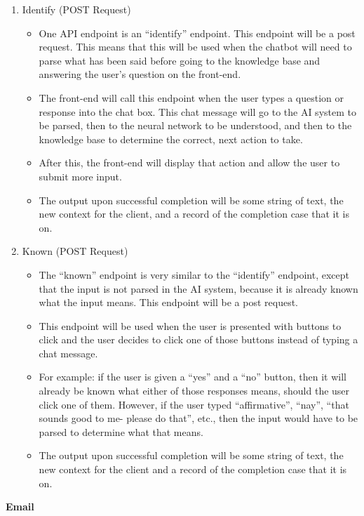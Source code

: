 \documentclass[titlepage, 12pt]{article}
\begin{document}
\begin{enumerate}
    \item Identify (POST Request)
    \begin{itemize}
        \item One API endpoint is an “identify” endpoint. This endpoint will be a post request. This means that this will be used when the chatbot will need to parse what has been said before going to the knowledge base and answering the user’s question on the front-end.
        \item The front-end will call this endpoint when the user types a question or response into the chat box. This chat message will go to the AI system to be parsed, then to the neural network to be understood, and then to the knowledge base to determine the correct, next action to take.
        \item After this, the front-end will display that action and allow the user to submit more input.
        \item The output upon successful completion will be some string of text, the new context for the client, and a record of the completion case that it is on.
    \end{itemize}
    \item Known (POST Request)
    \begin{itemize}
        \item The “known” endpoint is very similar to the “identify” endpoint, except that the input is not parsed in the AI system, because it is already known what the input means. This endpoint will be a post request.
        \item This endpoint will be used when the user is presented with buttons to click and the user decides to click one of those buttons instead of typing a chat message.
        \item For example: if the user is given a “yes” and a “no” button, then it will already be known what either of those responses means, should the user click one of them. However, if the user typed “affirmative”, “nay”, “that sounds good to me- please do that”, etc., then the input would have to be parsed to determine what that means. 
        \item The output upon successful completion will be some string of text, the new context for the client and a record of the completion case that it is on.
    \end{itemize}
\end{enumerate}

\textbf{Email}
\end{document}
